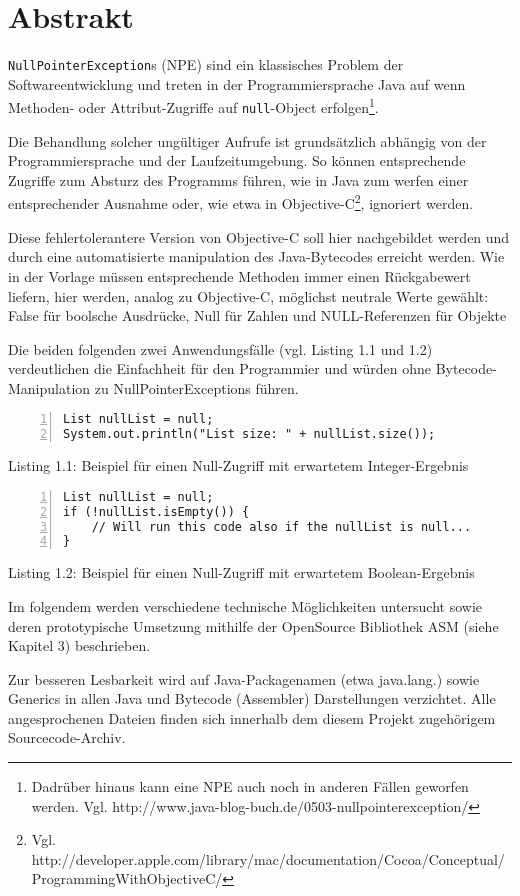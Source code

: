 
\chapter{Abstrakt}

\texttt{NullPointerException}s (NPE) sind ein klassisches Problem der Softwareentwicklung
und treten in der Programmiersprache Java auf wenn Methoden- oder Attribut-Zugriffe
auf \texttt{null}-Object erfolgen\footnote{Dadrüber hinaus kann eine NPE auch
noch in anderen Fällen geworfen werden. Vgl. http://www.java-blog-buch.de/0503-nullpointerexception/}.

Die Behandlung solcher ungültiger Aufrufe ist grundsätzlich abhängig von der
Programmiersprache und der Laufzeitumgebung. So können entsprechende Zugriffe
zum Absturz des Programms führen, wie in Java zum werfen einer entsprechender
Ausnahme oder, wie etwa in Objective-C\footnote{Vgl. http://developer.apple.com/library/mac/documentation/Cocoa/Conceptual/ProgrammingWithObjectiveC/}, ignoriert werden.

Diese fehlertolerantere Version von Objective-C soll hier nachgebildet werden
und durch eine automatisierte manipulation des Java-Bytecodes erreicht werden.
Wie in der Vorlage müssen entsprechende Methoden immer einen Rückgabewert liefern,
hier werden, analog zu Objective-C, möglichst neutrale Werte gewählt:
False für boolsche Ausdrücke, Null für Zahlen und NULL-Referenzen für Objekte

Die beiden folgenden zwei Anwendungsfälle (vgl. Listing 1.1 und 1.2) verdeutlichen
die Einfachheit für den Programmier und würden ohne Bytecode-Manipulation
zu NullPointerExceptions führen.

\begin{lstlisting}[basicstyle=\ttfamily,numbers=left,numberstyle=\footnotesize\ttfamily,backgroundcolor=\color{source}]
List nullList = null;
System.out.println("List size: " + nullList.size());
\end{lstlisting}
\centerline{Listing 1.1: Beispiel für einen Null-Zugriff mit erwartetem Integer-Ergebnis}

\vspace{0.3cm}

\begin{lstlisting}[basicstyle=\ttfamily,numbers=left,numberstyle=\footnotesize\ttfamily,backgroundcolor=\color{source}]
List nullList = null;
if (!nullList.isEmpty()) {
	// Will run this code also if the nullList is null...
}
\end{lstlisting}
\centerline{Listing 1.2: Beispiel für einen Null-Zugriff mit erwartetem Boolean-Ergebnis}

\vspace{0.3cm}

Im folgendem werden verschiedene technische Möglichkeiten untersucht sowie
deren prototypische Umsetzung mithilfe der OpenSource Bibliothek ASM (siehe Kapitel 3) beschrieben.

Zur besseren Lesbarkeit wird auf Java-Packagenamen (etwa java.lang.) sowie Generics
in allen Java und Bytecode (Assembler) Darstellungen verzichtet. Alle angesprochenen
Dateien finden sich innerhalb dem diesem Projekt zugehörigem Sourcecode-Archiv.

